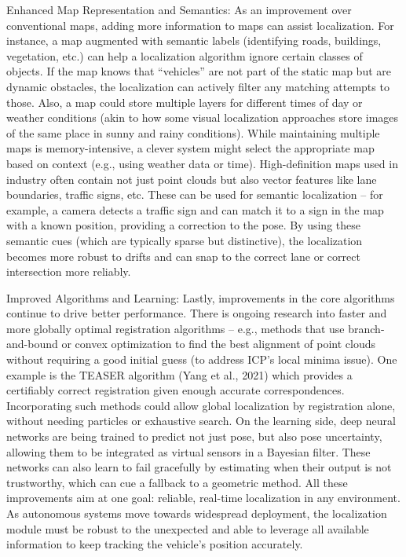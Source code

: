     Enhanced Map Representation and Semantics: As an improvement over conventional maps, adding more information to maps can assist localization. For instance, a map augmented with semantic labels (identifying roads, buildings, vegetation, etc.) can help a localization algorithm ignore certain classes of objects. If the map knows that “vehicles” are not part of the static map but are dynamic obstacles, the localization can actively filter any matching attempts to those. Also, a map could store multiple layers for different times of day or weather conditions (akin to how some visual localization approaches store images of the same place in sunny and rainy conditions). While maintaining multiple maps is memory-intensive, a clever system might select the appropriate map based on context (e.g., using weather data or time). High-definition maps used in industry often contain not just point clouds but also vector features like lane boundaries, traffic signs, etc. These can be used for semantic localization – for example, a camera detects a traffic sign and can match it to a sign in the map with a known position, providing a correction to the pose. By using these semantic cues (which are typically sparse but distinctive), the localization becomes more robust to drifts and can snap to the correct lane or correct intersection more reliably.

    Improved Algorithms and Learning: Lastly, improvements in the core algorithms continue to drive better performance. There is ongoing research into faster and more globally optimal registration algorithms – e.g., methods that use branch-and-bound or convex optimization to find the best alignment of point clouds without requiring a good initial guess (to address ICP’s local minima issue). One example is the TEASER algorithm (Yang et al., 2021) which provides a certifiably correct registration given enough accurate correspondences. Incorporating such methods could allow global localization by registration alone, without needing particles or exhaustive search. On the learning side, deep neural networks are being trained to predict not just pose, but also pose uncertainty, allowing them to be integrated as virtual sensors in a Bayesian filter. These networks can also learn to fail gracefully by estimating when their output is not trustworthy, which can cue a fallback to a geometric method. All these improvements aim at one goal: reliable, real-time localization in any environment. As autonomous systems move towards widespread deployment, the localization module must be robust to the unexpected and able to leverage all available information to keep tracking the vehicle’s position accurately.


